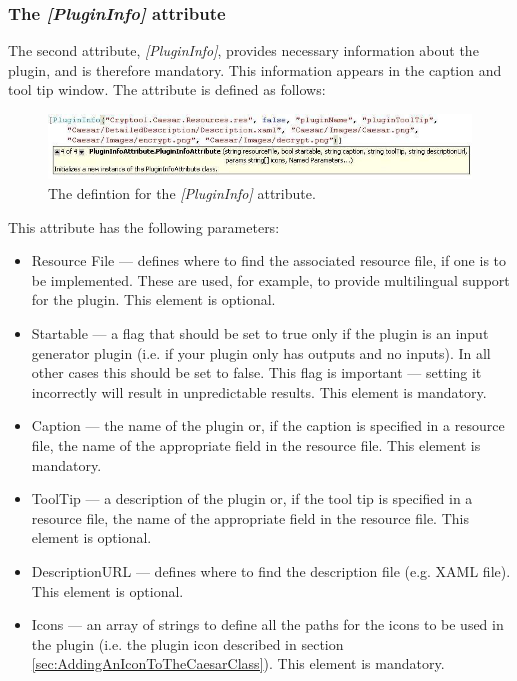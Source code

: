 
\subsubsection*{The \textit{[PluginInfo]} attribute}
\label{sec:ThePluginInfoAttribute}

The second attribute, \textit{[PluginInfo]}, provides necessary information about the plugin, and is therefore mandatory. This information appears in the caption and tool tip window. The attribute is defined as follows:

\begin{figure}[h]
	\centering
		\includegraphics[width=1.00\textwidth]{figures/attribute_plugininfo_new.jpg}
	\caption{The defintion for the \textit{[PluginInfo]} attribute.}
	\label{fig:attribute_plugininfo}
\end{figure}

This attribute has the following parameters:

\begin{itemize}
	\item Resource File --- defines where to find the associated resource file, if one is to be implemented. These are used, for example, to provide multilingual support for the plugin. This element is optional.
	\item Startable --- a flag that should be set to true only if the plugin is an input generator plugin (i.e. if your plugin only has outputs and no inputs). In all other cases this should be set to false. This flag is important --- setting it incorrectly will result in unpredictable results. This element is mandatory.
	\item Caption --- the name of the plugin or, if the caption is specified in a resource file, the name of the appropriate field in the resource file. This element is mandatory.
	\item ToolTip --- a description of the plugin or, if the tool tip is specified in a resource file, the name of the appropriate field in the resource file. This element is optional.
	\item DescriptionURL --- defines where to find the description file (e.g. XAML file). This element is optional.
	\item Icons --- an array of strings to define all the paths for the icons to be used in the plugin (i.e. the plugin icon described in section \ref{sec:AddingAnIconToTheCaesarClass}). This element is mandatory.
\end{itemize}

